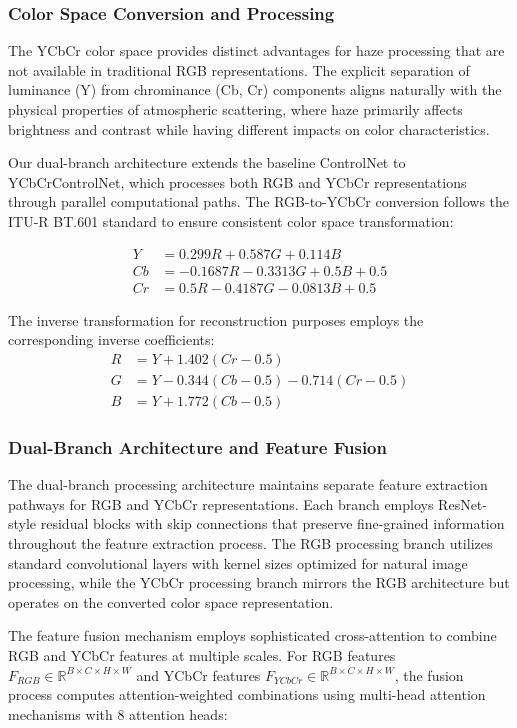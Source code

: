 \documentclass{article}
\begin{document}
\subsubsection{Color Space Conversion and Processing}

The YCbCr color space provides distinct advantages for haze processing that are not available in traditional RGB representations. The explicit separation of luminance (Y) from chrominance (Cb, Cr) components aligns naturally with the physical properties of atmospheric scattering, where haze primarily affects brightness and contrast while having different impacts on color characteristics.

Our dual-branch architecture extends the baseline ControlNet to YCbCrControlNet, which processes both RGB and YCbCr representations through parallel computational paths. The RGB-to-YCbCr conversion follows the ITU-R BT.601 standard to ensure consistent color space transformation:

\begin{align}
Y &= 0.299R + 0.587G + 0.114B \\
Cb &= -0.1687R - 0.3313G + 0.5B + 0.5 \\
Cr &= 0.5R - 0.4187G - 0.0813B + 0.5
\end{align}

The inverse transformation for reconstruction purposes employs the corresponding inverse coefficients:
\begin{align}
R &= Y + 1.402(Cr - 0.5) \\
G &= Y - 0.344(Cb - 0.5) - 0.714(Cr - 0.5) \\
B &= Y + 1.772(Cb - 0.5)
\end{align}

\subsubsection{Dual-Branch Architecture and Feature Fusion}

The dual-branch processing architecture maintains separate feature extraction pathways for RGB and YCbCr representations. Each branch employs ResNet-style residual blocks with skip connections that preserve fine-grained information throughout the feature extraction process. The RGB processing branch utilizes standard convolutional layers with kernel sizes optimized for natural image processing, while the YCbCr processing branch mirrors the RGB architecture but operates on the converted color space representation.

The feature fusion mechanism employs sophisticated cross-attention to combine RGB and YCbCr features at multiple scales. For RGB features $F_{RGB} \in \mathbb{R}^{B \times C \times H \times W}$ and YCbCr features $F_{YCbCr} \in \mathbb{R}^{B \times C \times H \times W}$, the fusion process computes attention-weighted combinations using multi-head attention mechanisms with 8 attention heads:
\end{document}
